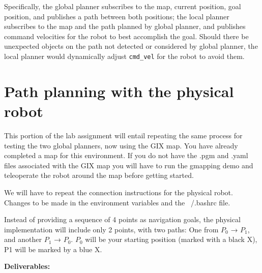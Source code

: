 \documentclass[12pt]{article}
\begin{document}
\begin{enumerate}
\begin{enumerate}
\begin{enumerate}
            Specifically, the global planner subscribes to the map, current position, goal position, and publishes a path between both positions; the local planner subscribes to the map and the path planned by global planner, and publishes command velocities for the robot to best accomplish the goal. Should there be unexpected objects on the path not detected or considered by global planner, the local planner would dynamically adjust \texttt{cmd_vel} for the robot to avoid them.

        \end{enumerate}
    \end{enumerate}
\end{enumerate}


\section{Path planning with the physical robot}

This portion of the lab assignment will entail repeating the same process for testing the two global planners, now using the GIX map. You have already completed a map for this environment. If you do not have the .pgm and .yaml files associated with the GIX map you will have to run the gmapping demo and teleoperate the robot around the map before getting started.

We will have to repeat the connection instructions for the physical robot. Changes to be made in the environment variables and the ~/.bashrc file.

Instead of providing a sequence of 4 points as navigation goals, the physical implementation will include only 2 points, with two paths: One from $P_0$ → $P_1$, and another $P_1$ → $P_0$. $P_0$ will be your starting position (marked with a black X), P1 will be marked by a blue X.

\textbf{Deliverables:}
\end{document}

